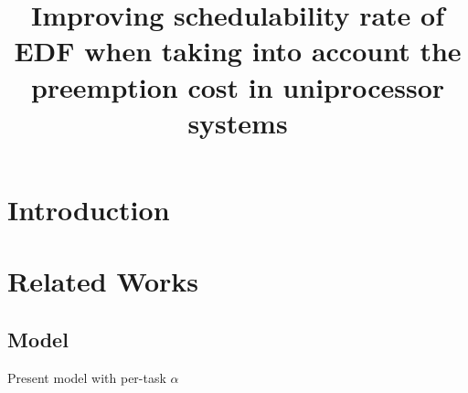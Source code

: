 \documentclass[a4paper,10pt]{article}
\title{Improving schedulability rate of EDF when taking into account the preemption cost in uniprocessor systems}
\begin{document}
\maketitle

\tableofcontents

\newpage

\begin{abstract}



\end{abstract}

\newpage

\section{Introduction}




\section{Related Works}

    \subsection{Model}

    Present model with per-task $\alpha$

\nocite{*}


\end{document}
